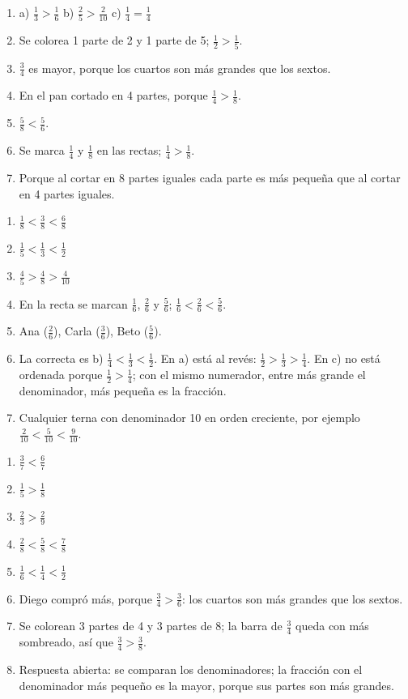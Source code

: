 \begin{enumerate}
\item a) $\frac{1}{3} > \frac{1}{6}$ \quad b) $\frac{2}{5} > \frac{2}{10}$ \quad c) $\frac{1}{4} = \frac{1}{4}$
\item Se colorea 1 parte de 2 y 1 parte de 5; $\frac{1}{2} > \frac{1}{5}$.
\item $\frac{3}{4}$ es mayor, porque los cuartos son más grandes que los sextos.
\item En el pan cortado en 4 partes, porque $\frac{1}{4} > \frac{1}{8}$.
\item $\frac{5}{8} < \frac{5}{6}$.
\item Se marca $\frac{1}{4}$ y $\frac{1}{8}$ en las rectas; $\frac{1}{4} > \frac{1}{8}$.
\item Porque al cortar en 8 partes iguales cada parte es más pequeña que al cortar en 4 partes iguales.
\end{enumerate}

\begin{enumerate}
\item $\frac{1}{8} < \frac{3}{8} < \frac{6}{8}$
\item $\frac{1}{5} < \frac{1}{3} < \frac{1}{2}$
\item $\frac{4}{5} > \frac{4}{8} > \frac{4}{10}$
\item En la recta se marcan $\frac{1}{6}$, $\frac{2}{6}$ y $\frac{5}{6}$; $\frac{1}{6} < \frac{2}{6} < \frac{5}{6}$.
\item Ana ($\frac{2}{6}$), Carla ($\frac{3}{6}$), Beto ($\frac{5}{6}$).
\item La correcta es b) $\frac{1}{4} < \frac{1}{3} < \frac{1}{2}$. En a) está al revés: $\frac{1}{2} > \frac{1}{3} > \frac{1}{4}$. En c) no está ordenada porque $\frac{1}{2} > \frac{1}{4}$; con el mismo numerador, entre más grande el denominador, más pequeña es la fracción.
\item Cualquier terna con denominador 10 en orden creciente, por ejemplo $\frac{2}{10} < \frac{5}{10} < \frac{9}{10}$.
\end{enumerate}

\wbanswers{\wbLReview}
\begin{enumerate}
\item $\frac{3}{7} < \frac{6}{7}$
\item $\frac{1}{5} > \frac{1}{8}$
\item $\frac{2}{3} > \frac{2}{9}$
\item $\frac{2}{8} < \frac{5}{8} < \frac{7}{8}$
\item $\frac{1}{6} < \frac{1}{4} < \frac{1}{2}$
\item Diego compró más, porque $\frac{3}{4} > \frac{3}{6}$: los cuartos son más grandes que los sextos.
\item Se colorean 3 partes de 4 y 3 partes de 8; la barra de $\frac{3}{4}$ queda con más sombreado, así que $\frac{3}{4} > \frac{3}{8}$.
\item Respuesta abierta: se comparan los denominadores; la fracción con el denominador más pequeño es la mayor, porque sus partes son más grandes.
\end{enumerate}
